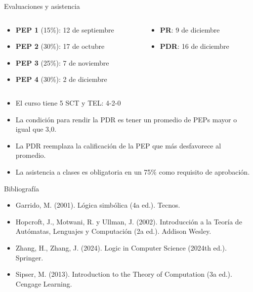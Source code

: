 \documentclass{beamer}
\begin{document}
\begin{frame}{Evaluaciones y asistencia}
  \begin{columns}
    \begin{column}{0.6\textwidth}
      \begin{itemize}
        \item \textbf{PEP 1} (15\%): 12 de septiembre
        \item \textbf{PEP 2} (30\%): 17 de octubre
        \item \textbf{PEP 3} (25\%): 7 de noviembre
        \item \textbf{PEP 4} (30\%): 2 de diciembre
      \end{itemize}
    \end{column}

    \begin{column}{0.4\textwidth}
      \begin{itemize}
        \item \textbf{PR}: 9 de diciembre
        \item \textbf{PDR}: 16 de diciembre
      \end{itemize}
    \end{column}
  \end{columns}

  \begin{itemize}[<+->]
    \vspace{0.3cm}
    \item El curso tiene 5 SCT y TEL: 4-2-0
    \item La condición para rendir la PDR es tener un promedio de PEPs mayor o
          igual que 3,0.
    \item La PDR reemplaza la calificación de la PEP que más desfavorece al
          promedio.
    \item La asistencia a clases es obligatoria en un 75\% como requisito de
          aprobación.
  \end{itemize}
\end{frame}


\begin{frame}{Bibliografía}
  \begin{itemize}
    \item Garrido, M. (2001). Lógica simbólica (4a ed.). Tecnos.
    \item Hopcroft, J., Motwani, R. y Ullman, J. (2002). Introducción a la
          Teoría de Autómatas, Lenguajes y Computación (2a ed.). Addison Wesley.
    \item Zhang, H., Zhang, J. (2024). Logic in Computer Science (2024th ed.).
          Springer.
    \item Sipser, M. (2013). Introduction to the Theory of Computation (3a ed.).
          Cengage Learning.
  \end{itemize}
\end{frame}
\end{document}
